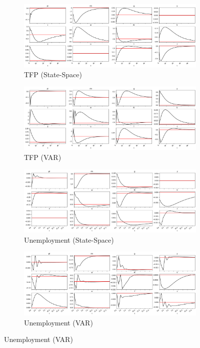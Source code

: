 \documentclass{article}
\begin{document}
\begin{figure}[!ht]
  \centering
  \begin{subfigure}{0.8\textwidth}
    \centering
    \includegraphics[width=\linewidth]{images/real_data_z_irf.png} 
    \caption{TFP (State-Space)}
    \label{us_z_irf}
  \end{subfigure}
  \begin{subfigure}{0.8\textwidth}
    \centering
    \includegraphics[width=\linewidth]{images/real_data_z_var_irf.png} 
    \caption{TFP (VAR)}
    \label{us_z_var_irf}
  \end{subfigure}
  \begin{subfigure}{0.8\textwidth}
    \includegraphics[width=\linewidth]{images/real_data_u_irf.png}
    \caption{Unemployment (State-Space)}
    \label{us_u_irf}
  \end{subfigure}
  \begin{subfigure}{0.8\textwidth}
    \includegraphics[width=\linewidth]{images/real_data_u_var_irf.png}
    \caption{Unemployment (VAR)}
    \label{us_u_var_irf}
  \end{subfigure}


\end{figure}
\end{document}
